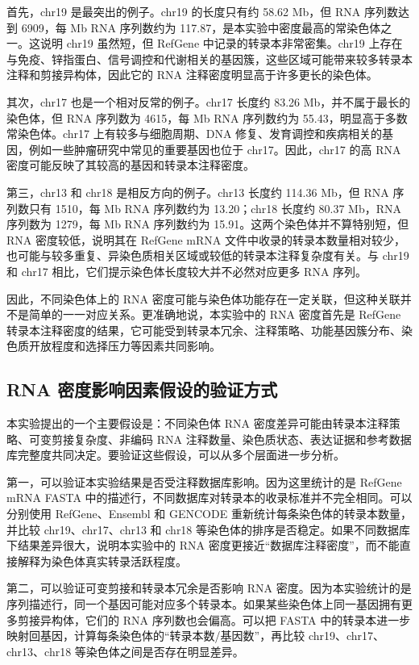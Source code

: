 \documentclass[12pt,a4paper,fontset=fandol]{ctexart}
\begin{document}
首先，chr19 是最突出的例子。chr19 的长度只有约 58.62 Mb，但 RNA 序列数达到 6909，每 Mb RNA 序列数约为 117.87，是本实验中密度最高的常染色体之一。这说明 chr19 虽然短，但 RefGene 中记录的转录本非常密集。chr19 上存在与免疫、锌指蛋白、信号调控和代谢相关的基因簇，这些区域可能带来较多转录本注释和剪接异构体，因此它的 RNA 注释密度明显高于许多更长的染色体。

其次，chr17 也是一个相对反常的例子。chr17 长度约 83.26 Mb，并不属于最长的染色体，但 RNA 序列数为 4615，每 Mb RNA 序列数约为 55.43，明显高于多数常染色体。chr17 上有较多与细胞周期、DNA 修复、发育调控和疾病相关的基因，例如一些肿瘤研究中常见的重要基因也位于 chr17。因此，chr17 的高 RNA 密度可能反映了其较高的基因和转录本注释密度。

第三，chr13 和 chr18 是相反方向的例子。chr13 长度约 114.36 Mb，但 RNA 序列数只有 1510，每 Mb RNA 序列数约为 13.20；chr18 长度约 80.37 Mb，RNA 序列数为 1279，每 Mb RNA 序列数约为 15.91。这两个染色体并不算特别短，但 RNA 密度较低，说明其在 RefGene mRNA 文件中收录的转录本数量相对较少，也可能与较多重复、异染色质相关区域或较低的转录本注释复杂度有关。与 chr19 和 chr17 相比，它们提示染色体长度较大并不必然对应更多 RNA 序列。

因此，不同染色体上的 RNA 密度可能与染色体功能存在一定关联，但这种关联并不是简单的一一对应关系。更准确地说，本实验中的 RNA 密度首先是 RefGene 转录本注释密度的结果，它可能受到转录本冗余、注释策略、功能基因簇分布、染色质开放程度和选择压力等因素共同影响。

\subsection{RNA 密度影响因素假设的验证方式}

本实验提出的一个主要假设是：不同染色体 RNA 密度差异可能由转录本注释策略、可变剪接复杂度、非编码 RNA 注释数量、染色质状态、表达证据和参考数据库完整度共同决定。要验证这些假设，可以从多个层面进一步分析。

第一，可以验证本实验结果是否受注释数据库影响。因为这里统计的是 RefGene mRNA FASTA 中的描述行，不同数据库对转录本的收录标准并不完全相同。可以分别使用 RefGene、Ensembl 和 GENCODE 重新统计每条染色体的转录本数量，并比较 chr19、chr17、chr13 和 chr18 等染色体的排序是否稳定。如果不同数据库下结果差异很大，说明本实验中的 RNA 密度更接近“数据库注释密度”，而不能直接解释为染色体真实转录活跃程度。

第二，可以验证可变剪接和转录本冗余是否影响 RNA 密度。因为本实验统计的是序列描述行，同一个基因可能对应多个转录本。如果某些染色体上同一基因拥有更多剪接异构体，它们的 RNA 序列数也会偏高。可以把 FASTA 中的转录本进一步映射回基因，计算每条染色体的“转录本数/基因数”，再比较 chr19、chr17、chr13、chr18 等染色体之间是否存在明显差异。
\end{document}
